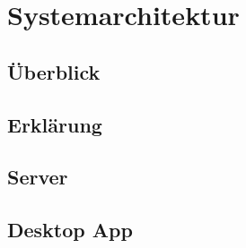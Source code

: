 
\section{Systemarchitektur}

\subsection{Überblick}

\subsection{Erklärung}

\subsection{Server}

\subsection{Desktop App}
